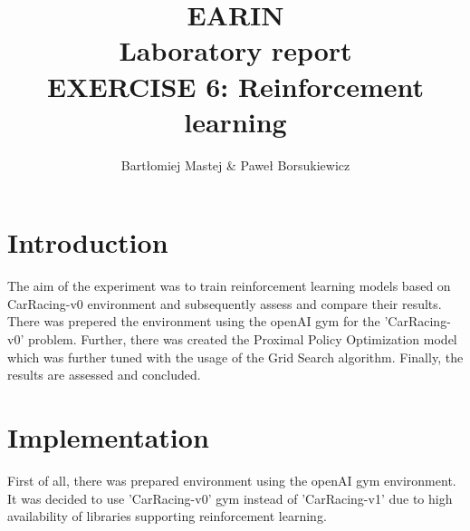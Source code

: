 \documentclass[runningheads]{llncs}
\begin{document}
%
\title{EARIN\\Laboratory report\\EXERCISE 6: Reinforcement learning}
%
\author{Bartłomiej Mastej \& Paweł Borsukiewicz}
%

%
\maketitle              %
%
%
%
%
\section{Introduction}
The aim of the experiment was to train reinforcement learning models based on CarRacing-v0 environment and subsequently assess and compare their results. There was prepered the environment using the openAI gym for the 'CarRacing-v0' problem. Further, there was created the Proximal Policy Optimization model which was further tuned with the usage of the Grid Search algorithm. Finally, the results are assessed and concluded.

\section{Implementation}
First of all, there was prepared environment using the openAI gym environment. It was decided to use 'CarRacing-v0' gym instead of 'CarRacing-v1' due to high availability of libraries supporting reinforcement learning.
\end{document}
